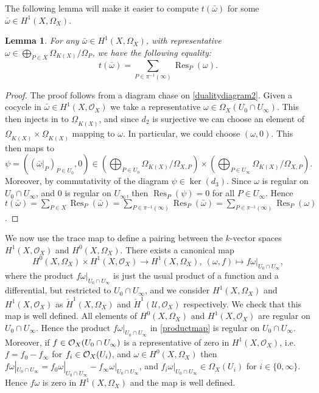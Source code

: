 \documentclass[draft, 11pt]{article} %
\theoremstyle{plain}
\newtheorem{lem}[defn]{Lemma}
\theoremstyle{remark}
\newcommand{\cO}{{\cal O}}
\newcommand{\ra}{\rightarrow}
\newcommand{\hzero}{{H^0(X,\Omega_X)}}
\newcommand{\hone}{H^1(X,\mathcal{O}_X)}
\newcommand{\cechhone}{\check{H}^1(\mathcal U,\mathcal O_X)}
\DeclareMathOperator{\res}{Res}
\begin{document}
The following lemma will make it easier to compute $t(\bar \omega)$ for some $\bar \omega \in H^1(X,\Omega_X)$.
\begin{lem}\label{tracemaplemma}
For any $\bar \omega \in H^1(X,\Omega_X)$, with representative $\omega \in \bigoplus_{P \in X} \Omega_{K(X)}/\Omega_P$, we have the following equality:
\[
t(\bar \omega) = \sum_{P \in \pi^{-1}(\infty)}\res_P(\omega).
\]
\end{lem}
\begin{proof}
The proof follows from a diagram chase on \eqref{dualitydiagram2}.
Given a cocycle in $\bar \omega \in \hone$ we take a representative $\omega \in \Omega_X(U_0 \cap U_\infty)$.
This then injects in to $\underline{\Omega}_{K(X)}$, and since $d_2$ is surjective we can choose an element of $\underline{\Omega}_{K(X)} \times \underline{\Omega}_{K(X)}$ mapping to $\omega$.
In particular, we could choose $(\omega,0)$.
This then maps to 
\[
\psi = ((\bar{\omega}|_P)_{P\in U_0}, 0) \in \left( \bigoplus_{P \in U_0} \Omega_{K(X)}/\Omega_{X,P}\right) \times \left( \bigoplus_{P \in U_\infty} \Omega_{K(X)}/\Omega_{X,P} \right).
\]
Moreover, by commutativity of the diagram $\psi \in \ker(d_3)$.
Since $\omega$ is regular on $U_0 \cap U_\infty$, and $0$ is regular on $U_\infty$, then $\res_P(\psi) = 0$ for all $P \in U_\infty$.
Hence $t(\bar \omega) = \sum_{P \in X}\res_P(\bar \omega) = \sum_{P \in \pi^{-1}(\infty)} \res_P(\bar \omega) = \sum_{P \in \pi^{-1}(\infty)} \res_P(\omega)$.
\end{proof}

We now use the trace map to define a pairing between the $k$-vector spaces $\hone$ and $\hzero$.
There exists a canonical map 
\begin{equation}\label{productmap}
\hzero \times \hone \ra H^1\left(X, \Omega_X\right), \ (\omega, f) \mapsto f  \omega|_{U_0 \cap U_\infty},
\end{equation}
where the product $f \omega|_{U_0\cap U_\infty}$ is just the usual product of a function and a differential, but restricted to $U_0 \cap U_\infty$, and we consider $H^1(X,\Omega_X)$ and $\hone$ as $\check{H}^1(X,\Omega_X)$ and $\cechhone$ respectively.
We check that this map is well defined.
All elements of $\hzero$ and $\hone$ are regular on $U_0 \cap U_\infty$.
Hence the product $f \omega|_{U_0 \cap U_\infty}$ in \eqref{productmap} is regular on $U_0 \cap U_\infty$.
Moreover, if $f \in \cO_X(U_0 \cap U_\infty)$ is a representative of zero in $\hone$, i.e.~$f = f_0 - f_\infty$ for $f_i \in \cO_X(U_i)$, and $\omega  \in \hzero$ then $f \omega|_{U_0 \cap U_\infty} = f_0\omega|_{U_0 \cap U_\infty} - f_\infty \omega|_{U_0 \cap U_\infty}$, and $f_i \omega|_{U_0\cap U_\infty} \in \Omega_X(U_i)$ for $i\in \{0, \infty\}$.
Hence $f\omega$ is zero in $H^1(X,\Omega_X)$ and the map is well defined.
\end{document}
